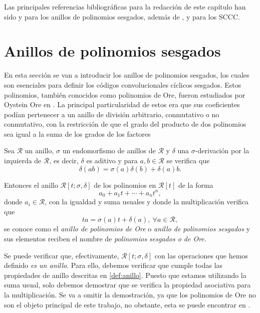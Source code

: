 Las principales referencias bibliográficas para la redacción de este capítulo han sido \cite{gluesingluerssen2019skewpolynomial} y \cite{jacobson1996} para los anillos de polinomios sesgados, además de \cite{cccheide}, \cite{SCCC} y \cite{gomez2017sugiyama} para los SCCC.

\section{Anillos de polinomios sesgados}
En esta sección se van a introducir los anillos de polinomios sesgados, los cuales son esenciales para definir los códigos convolucionales cíclicos sesgados. Estos polinomios, también conocidos como polinomios de Ore, fueron estudiados por Oystein Ore en \cite{ore1933}. La principal particularidad de estos era que sus coeficientes podían pertenecer a un anillo de división arbitrario, conmutativo o no conmutativo, con la restricción de que el grado del producto de dos polinomios sea igual a la suma de los grados de los factores

\begin{definicion}
    Sea $\mathcal{R}$ un anillo, $\sigma$ un endomorfismo de anillos de $\mathcal{R}$ y $\delta$ una $\sigma$-derivación por la izquierda de $\mathcal{R}$, es decir, $\delta$ es aditivo y para $a,b \in \mathcal{R}$ se verifica que 
    $$ \delta(ab) = \sigma(a)\delta(b) + \delta(a)b.$$

    Entonces el anillo $\mathcal{R}[t;\sigma,\delta]$ de los polinomios en $\mathcal{R}[t]$ de la forma 
    $$a_0 + a_1t + \cdots + a_nt^n,$$
    donde $a_i \in \mathcal{R}$, con la igualdad y suma usuales y donde la multiplicación verifica que $$ta = \sigma(a)t + \delta(a), \ \forall a \in \mathcal{R},$$
    se conoce como el \emph{anillo de polinomios de Ore} o \emph{anillo de polinomios sesgados} y sus elementos reciben el nombre de \emph{polinomios sesgados o de Ore.}
\end{definicion}

Se puede verificar que, efectivamente, $\mathcal{R}[t;\sigma,\delta]$ con las operaciones que hemos definido \emph{es un anillo}. Para ello, debemos verificar que cumple todas las propiedades de anillo descritas en \ref{def:anillo}. Puesto que estamos utilizando la suma usual, solo debemos demostrar que se verifica la propiedad asociativa para la multiplicación. Se va a omitir la demostración, ya que los polinomios de Ore no son el objeto principal de este trabajo, no obstante, esta se puede encontrar en \cite{jacobson1996}.

